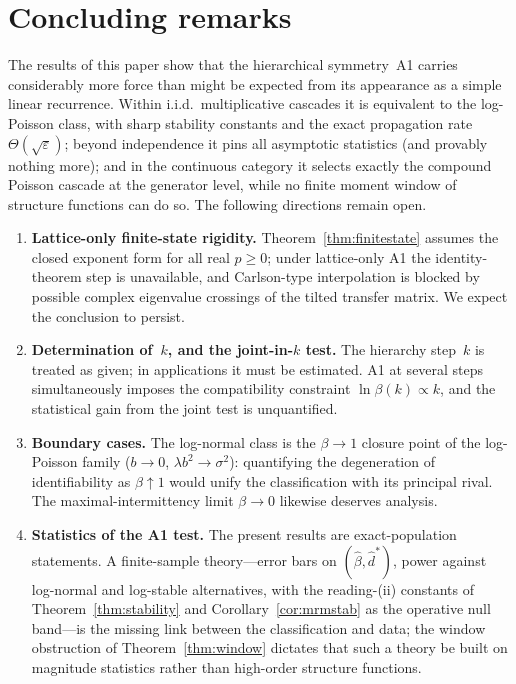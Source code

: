 \documentclass[12pt]{amsart}
\theoremstyle{definition}
\theoremstyle{remark}
\begin{document}
\section{Concluding remarks}
\label{sec:discussion}

The results of this paper show that the hierarchical symmetry~A1
carries considerably more force than might be expected from its
appearance as a simple linear recurrence.  Within i.i.d.\
multiplicative cascades it is equivalent to the log-Poisson class,
with sharp stability constants and the exact propagation rate
$\Theta(\sqrt\varepsilon)$; beyond independence it pins all
asymptotic statistics (and provably nothing more); and in the
continuous category it selects exactly the compound Poisson
cascade at the generator level, while no finite moment window of
structure functions can do so.  The following directions remain
open.

\begin{enumerate}
\item \textbf{Lattice-only finite-state rigidity.}
  Theorem~\ref{thm:finitestate} assumes the closed exponent form for
  all real $p \ge 0$; under lattice-only A1 the identity-theorem
  step is unavailable, and Carlson-type interpolation is blocked by
  possible complex eigenvalue crossings of the tilted transfer
  matrix.  We expect the conclusion to persist.

\item \textbf{Determination of~$k$, and the joint-in-$k$ test.}
  The hierarchy step~$k$ is treated as given; in applications it
  must be estimated.  A1 at several steps simultaneously imposes the
  compatibility constraint $\ln\beta(k) \propto k$, and the
  statistical gain from the joint test is unquantified.

\item \textbf{Boundary cases.}  The log-normal class is the $\beta
  \to 1$ closure point of the log-Poisson family ($b \to 0$,
  $\lambda b^2 \to \sigma^2$): quantifying the degeneration of
  identifiability as $\beta \uparrow 1$ would unify the
  classification with its principal rival.  The maximal-intermittency
  limit $\beta \to 0$ likewise deserves analysis.

\item \textbf{Statistics of the A1 test.}  The present results are
  exact-population statements.  A finite-sample theory---error bars
  on $(\hat\beta, \hat d^*)$, power against log-normal and
  log-stable alternatives, with the reading-(ii) constants of
  Theorem~\ref{thm:stability} and Corollary~\ref{cor:mrmstab} as the
  operative null band---is the missing link between the
  classification and data; the window obstruction of
  Theorem~\ref{thm:window} dictates that such a theory be built on
  magnitude statistics rather than high-order structure functions.
\end{enumerate}
\end{document}
